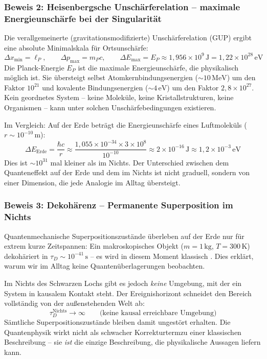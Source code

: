 ﻿\documentclass[12pt,a4paper]{report}
\begin{document}
\subsubsection{Beweis 2: Heisenbergsche Unschärferelation -- maximale Energieunschärfe bei der Singularität}

Die verallgemeinerte (gravitationsmodifizierte) Unschärferelation (GUP) \cite{veneziano1986,maggiore1993} ergibt eine absolute Minimalskala für Ortsunschärfe:
\begin{equation*}
    \Delta x_{\min} = \ell_P, \qquad \Delta p_{\max} = m_P c, \qquad \Delta E_{\max} = E_P \approx 1{,}956 \times 10^9\,\text{J} = 1{,}22 \times 10^{28}\,\text{eV}
\end{equation*}
Die Planck-Energie $E_P$ ist die maximale Energieunschärfe, die physikalisch möglich ist. Sie übersteigt selbst Atomkernbindungsenergien ($\sim 10\,\text{MeV}$) um den Faktor $10^{21}$ und kovalente Bindungsenergien ($\sim 4\,\text{eV}$) um den Faktor $2{,}8 \times 10^{27}$. Kein geordnetes System -- keine Moleküle, keine Kristallstrukturen, keine Organismen -- kann unter solchen Unschärfebedingungen existieren.

Im Vergleich: Auf der Erde beträgt die Energieunschärfe eines Luftmoleküls ($r \sim 10^{-10}\,\text{m}$):
\begin{equation*}
    \Delta E_{\mathrm{Erde}} = \frac{\hbar c}{r} \approx \frac{1{,}055 \times 10^{-34} \times 3 \times 10^8}{10^{-10}} \approx 2 \times 10^{-16}\,\text{J} \approx 1{,}2 \times 10^{-3}\,\text{eV}
\end{equation*}
Dies ist $\sim 10^{31}$ mal kleiner als im Nichts. Der Unterschied zwischen dem Quanteneffekt auf der Erde und dem im Nichts ist nicht graduell, sondern von einer Dimension, die jede Analogie im Alltag übersteigt.

\subsubsection{Beweis 3: Dekohärenz -- Permanente Superposition im Nichts}

Quantenmechanische Superpositionszustände überleben auf der Erde nur für extrem kurze Zeitspannen: Ein makroskopisches Objekt ($m = 1\,\text{kg}$, $T = 300\,\text{K}$) dekohäriert in $\tau_D \sim 10^{-41}\,\text{s}$ -- es wird in diesem Moment klassisch \cite{zurek2003}. Dies erklärt, warum wir im Alltag keine Quantenüberlagerungen beobachten.

Im Nichts des Schwarzen Lochs gibt es jedoch \emph{keine} Umgebung, mit der ein System in kausalem Kontakt steht. Der Ereignishorizont schneidet den Bereich vollständig von der außenstehenden Welt ab:
\begin{equation*}
    \tau_D^{\mathrm{Nichts}} \to \infty \qquad \text{(keine kausal erreichbare Umgebung)}
\end{equation*}
Sämtliche Superpositionszustände bleiben damit ungestört erhalten. Die Quantenphysik wirkt nicht als schwacher Korrekturtermzu einer klassischen Beschreibung -- sie \emph{ist} die einzige Beschreibung, die physikalische Aussagen liefern kann.
\end{document}

